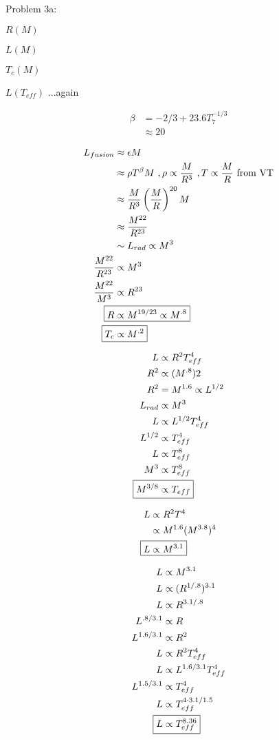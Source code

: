 \documentclass[10pt,letter,preprint]{aastex}
\newcommand{\pt}{\propto}
\begin{document}
Problem 3a:

\begin{list}{*}{}
  \item $R(M)$
  \item $L(M)$
  \item $T_c(M)$
  \item $L(T_{eff})$ ...again
\end{list}

\begin{align}
\beta & = -2/3 + 23.6T_7^{-1/3}\\
& \approx 20
\end{align}

\begin{align}
L_{fusion} & \approx \epsilon M\\
& \approx \rho T^\beta M ~, \rho \propto \frac{M}{R^3}~,T \propto \frac{M}{R}~\text{from VT} \\
& \approx \frac{M}{R^3} \left( \frac{M}{R} \right)^{20} M\\
& \approx \frac{M^{22}}{R^{23}}\\
& \sim L_{rad} \propto M^3\\
\frac{M^{22}}{R^{23}} & \propto M^3\\
\frac{M^{22}}{M^3} & \propto R^{23}\\
\Aboxed{R & \propto M^{19/23} \propto M^{.8}}\\
\Aboxed{T_c & \propto M^{.2}}
\end{align}

\begin{align}
L & \propto R^2 T_{eff}^4\\
R^2 & \propto (M^{.8})2\\
R^2 & = M^{1.6} \propto L^{1/2}\\
L_{rad} & \propto M^3\\
L & \propto L^{1/2}T_{eff}^4\\
L^{1/2} & \propto T_{eff}^4\\
L& \propto T_{eff}^8\\
M^3 & \propto T_{eff}^8\\
\Aboxed{M^{3/8} & \propto T_{eff}}
\end{align}

\begin{align}
L &\propto R^2 T^4\\
&\pt M^{1.6}(M^{3.8})^{4}\\
\Aboxed{L &\pt M^{3.1}}
\end{align}

\begin{align}
L &\pt M^{3.1}\\
L &\pt (R^{1/.8})^{3.1}\\
L &\pt R^{3.1/.8}\\
L^{.8/3.1} &\pt R\\
L^{1.6/3.1} &\pt R^2\\
L &\pt R^2 T_{eff}^4\\
L &\pt L^{1.6/3.1} T_{eff}^4\\
L^{1.5/3.1} &\pt T_{eff}^4\\
L &\pt T_{eff}^{4 \cdot 3.1/1.5}\\
\Aboxed{L &\pt T_{eff}^{8.36}}
\end{align}
\end{document}

